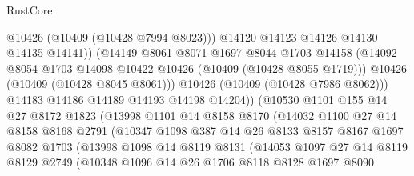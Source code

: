 \begin{lexlean}{RustCore}
\begin{coremodule}
                              @10426
                              (@10409 (@10428 @7994 @8023)))
                            @14120
                            @14123
                            @14126
                            @14130
                            @14135
                            @14141))
                        (@14149
                          @8061
                          @8071
                          @1697
                          @8044
                          @1703
                          @14158
                          (@14092 @8054 @1703 @14098 @10422 @10426 (@10409 (@10428 @8055 @1719)))
                          @10426
                          (@10409 (@10428 @8045 @8061)))
                        @10426
                        (@10409 (@10428 @7986 @8062)))
                      @14183
                      @14186
                      @14189
                      @14193
                      @14198
                      @14204))
                  (@10530
                    @1101
                    @155
                    @14
                    @27
                    @8172
                    @1823
                    (@13998
                      @1101
                      @14
                      @8158
                      @8170
                      (@14032
                        @1100
                        @27
                        @14
                        @8158
                        @8168
                        @2791
                        (@10347
                          @1098
                          @387
                          @14
                          @26
                          @8133
                          @8157
                          @8167
                          @1697
                          @8082
                          @1703
                          (@13998
                            @1098
                            @14
                            @8119
                            @8131
                            (@14053
                              @1097
                              @27
                              @14
                              @8119
                              @8129
                              @2749
                              (@10348
                                @1096
                                @14
                                @26
                                @1706
                                @8118
                                @8128
                                @1697
                                @8090

\end{coremodule}
\end{lexlean}
